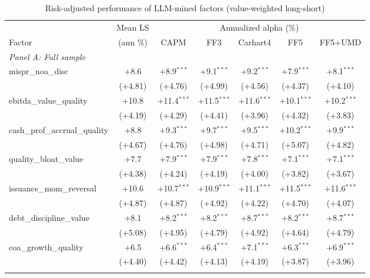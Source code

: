 \begin{table}[htbp]\centering
\caption{Risk-adjusted performance of LLM-mined factors (value-weighted long-short)}
\label{tab:alphas_vw}
\begin{threeparttable}\footnotesize
\begin{tabular}{lcccccc}
\toprule
 & Mean LS & \multicolumn{5}{c}{Annualized alpha (\%)} \\
\cmidrule(lr){3-7}
Factor & (ann \%) & CAPM & FF3 & Carhart4 & FF5 & FF5+UMD \\
\midrule
\multicolumn{7}{l}{\textit{Panel A: Full sample}} \\
\addlinespace
mispr\_noa\_disc & +8.6 & +8.9$^{***}$ & +9.1$^{***}$ & +9.2$^{***}$ & +7.9$^{***}$ & +8.1$^{***}$ \\
 & (+4.81) & (+4.76) & (+4.99) & (+4.56) & (+4.37) & (+4.10) \\
\addlinespace
ebitda\_value\_quality & +10.8 & +11.4$^{***}$ & +11.5$^{***}$ & +11.6$^{***}$ & +10.1$^{***}$ & +10.2$^{***}$ \\
 & (+4.19) & (+4.29) & (+4.41) & (+3.96) & (+4.32) & (+3.83) \\
\addlinespace
cash\_prof\_accrual\_quality & +8.8 & +9.3$^{***}$ & +9.7$^{***}$ & +9.5$^{***}$ & +10.2$^{***}$ & +9.9$^{***}$ \\
 & (+4.67) & (+4.76) & (+4.98) & (+4.71) & (+5.07) & (+4.82) \\
\addlinespace
quality\_bloat\_value & +7.7 & +7.9$^{***}$ & +7.9$^{***}$ & +7.8$^{***}$ & +7.1$^{***}$ & +7.1$^{***}$ \\
 & (+4.38) & (+4.24) & (+4.19) & (+4.00) & (+3.82) & (+3.67) \\
\addlinespace
issuance\_mom\_reversal & +10.6 & +10.7$^{***}$ & +10.9$^{***}$ & +11.1$^{***}$ & +11.5$^{***}$ & +11.6$^{***}$ \\
 & (+4.87) & (+4.87) & (+4.92) & (+4.22) & (+4.70) & (+4.07) \\
\addlinespace
debt\_discipline\_value & +8.1 & +8.2$^{***}$ & +8.2$^{***}$ & +8.7$^{***}$ & +8.2$^{***}$ & +8.7$^{***}$ \\
 & (+5.08) & (+4.95) & (+4.79) & (+4.92) & (+4.64) & (+4.79) \\
\addlinespace
coa\_growth\_quality & +6.5 & +6.6$^{***}$ & +6.4$^{***}$ & +7.1$^{***}$ & +6.3$^{***}$ & +6.9$^{***}$ \\
 & (+4.40) & (+4.42) & (+4.13) & (+4.19) & (+3.87) & (+3.96) \\
\addlinespace
\midrule
\multicolumn{7}{l}{\textit{Panel B: Out-of-sample (post-2000-12-31)}} \\

\end{tabular}
\end{threeparttable}
\end{table}
